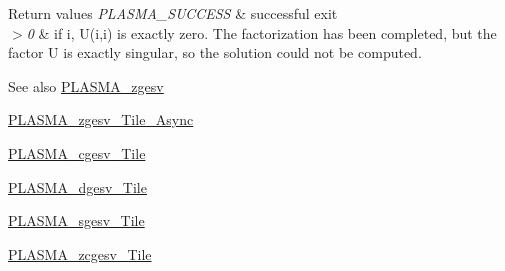 \begin{DoxyRetVals}{Return values}
{\em P\+L\+A\+S\+M\+A\+\_\+\+S\+U\+C\+C\+E\+S\+S} & successful exit \\
\hline
{\em $>$0} & if i, U(i,i) is exactly zero. The factorization has been completed, but the factor U is exactly singular, so the solution could not be computed.\\
\hline
\end{DoxyRetVals}
\begin{DoxySeeAlso}{See also}
\hyperlink{group__PLASMA__Complex64__t_ga94397d6fba523c946f1e56cfe9aa967d_ga94397d6fba523c946f1e56cfe9aa967d}{P\+L\+A\+S\+M\+A\+\_\+zgesv} 

\hyperlink{group__PLASMA__Complex64__t__Tile__Async_ga34f307dbc6cd1dc5adab0970fe559a30_ga34f307dbc6cd1dc5adab0970fe559a30}{P\+L\+A\+S\+M\+A\+\_\+zgesv\+\_\+\+Tile\+\_\+\+Async} 

\hyperlink{group__PLASMA__Complex32__t__Tile_ga0dfdc0c54977335c9afb38f60764274d_ga0dfdc0c54977335c9afb38f60764274d}{P\+L\+A\+S\+M\+A\+\_\+cgesv\+\_\+\+Tile} 

\hyperlink{group__double__Tile_gaacf09cca256b82b81087dffa3cabe2d8_gaacf09cca256b82b81087dffa3cabe2d8}{P\+L\+A\+S\+M\+A\+\_\+dgesv\+\_\+\+Tile} 

\hyperlink{group__float__Tile_gaff4ad087d2efc588d2ca4152c4edd398_gaff4ad087d2efc588d2ca4152c4edd398}{P\+L\+A\+S\+M\+A\+\_\+sgesv\+\_\+\+Tile} 

\hyperlink{group__PLASMA__Complex64__t__Tile_ga1323bdbc5973b2ee613e9c128a98d419_ga1323bdbc5973b2ee613e9c128a98d419}{P\+L\+A\+S\+M\+A\+\_\+zcgesv\+\_\+\+Tile} 
\end{DoxySeeAlso}
\hypertarget{group__PLASMA__Complex64__t__Tile_ga1a980778f7600b387397b427443d1aa8_ga1a980778f7600b387397b427443d1aa8}{}
